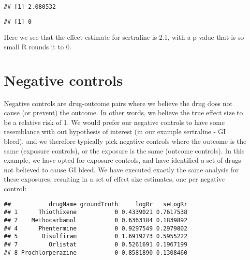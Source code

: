 \documentclass[
]{article}
\newenvironment{Shaded}{\begin{snugshade}}{\end{snugshade}}
\newcommand{\DecValTok}[1]{\textcolor[rgb]{0.00,0.00,0.81}{#1}}
\newcommand{\KeywordTok}[1]{\textcolor[rgb]{0.13,0.29,0.53}{\textbf{#1}}}
\newcommand{\NormalTok}[1]{#1}
\newcommand{\OperatorTok}[1]{\textcolor[rgb]{0.81,0.36,0.00}{\textbf{#1}}}
\newcommand{\StringTok}[1]{\textcolor[rgb]{0.31,0.60,0.02}{#1}}
\begin{document}
\begin{verbatim}
## [1] 2.080532
\end{verbatim}

\begin{Shaded}
\end{Shaded}

\begin{verbatim}
## [1] 0
\end{verbatim}

Here we see that the effect estimate for sertraline is 2.1, with a
p-value that is so small R rounds it to 0.

\hypertarget{negative-controls}{%
\section{Negative controls}\label{negative-controls}}

Negative controls are drug-outcome pairs where we believe the drug does
not cause (or prevent) the outcome. In other words, we believe the true
effect size to be a relative risk of 1. We would prefer our negative
controls to have some resemblance with out hypothesis of interest (in
our example sertraline - GI bleed), and we therefore typically pick
negative controls where the outcome is the same (exposure controls), or
the exposure is the same (outcome controls). In this example, we have
opted for exposure controls, and have identified a set of drugs not
believed to cause GI bleed. We have executed exactly the same analysis
for these exposures, resulting in a set of effect size estimates, one
per negative control:

\begin{Shaded}
\end{Shaded}

\begin{verbatim}
##           drugName groundTruth     logRr   seLogRr
## 1      Thiothixene           0 0.4339021 0.7617538
## 2    Methocarbamol           0 0.6363184 0.1839892
## 4      Phentermine           0 0.9297549 0.2979802
## 5       Disulfiram           0 1.6919273 0.5955222
## 7         Orlistat           0 0.5261691 0.1967199
## 8 Prochlorperazine           0 0.8581890 0.1308460
\end{verbatim}
\end{document}
